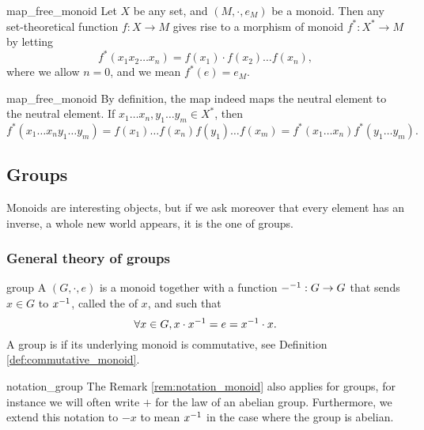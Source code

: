 \begin{clem}{}{map_free_monoid}
    Let \( X \) be any set, and \( (M, \cdot, e_M) \) be a monoid. Then any set-theoretical function \( f : X \to M \) gives rise to a morphism of monoid \( f^* : X^* \to M \) by letting
    \begin{equation*}
        f^*(x_1 x_2 \dots x_n) = f(x_1)\cdot f(x_2) \dots f(x_n),
    \end{equation*}
    where we allow \( n = 0 \), and we mean \( f^*(e) = e_M \).
\end{clem}
\begin{lemproof}{map_free_monoid}
    By definition, the map indeed maps the neutral element to the neutral element. If \( x_1\dots x_n, y_1 \dots y_m \in X^* \), then 
    \begin{equation*}
        f^*(x_1\dots x_n y_1 \dots y_m) = f(x_1) \dots f(x_n)f(y_1) \dots f(x_m) = f^*(x_1\dots x_n)f^*(y_1\dots y_m).
    \end{equation*}
\end{lemproof}

\subsection{Groups}

Monoids are interesting objects, but if we ask moreover that every element has an inverse, a whole new world appears, it is the one of groups.

\subsubsection{General theory of groups}

\begin{cdef}{}{group}
    A  \( (G, \cdot, e) \) is a monoid together with a function \( {-}^{-1} : G \to G \) that sends \( x \in G \) to \( {x}^{-1} \), called the  of \( x \), and such that
    \begin{equation*}
        \forall x \in G, x \cdot {x}^{-1} = e = {x}^{-1} \cdot x.
    \end{equation*}
    A group is  if its underlying monoid is commutative, see Definition \ref{def:commutative_monoid}.
\end{cdef}

\begin{crem}{}{notation_group}
    The Remark \ref{rem:notation_monoid} also applies for groups, for instance we will often write \( + \) for the law of an abelian group. Furthermore, we extend this notation to \( - x \) to mean \( {x}^{-1} \) in the case where the group is abelian.
\end{crem}


